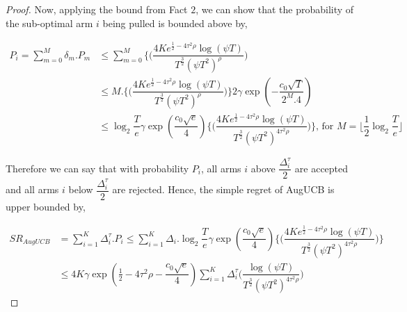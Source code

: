 \begin{proof}
Now, applying the bound from Fact $2$, we can show that the probability of the sub-optimal arm $i$ being pulled is bounded above by,

\begin{align*}
P_{i} = \sum_{m=0}^{M} \delta_{m}.P_{m} &\leq \sum_{m=0}^{M} \bigg\lbrace\bigg(\dfrac{4Ke^{\frac{1}{2}-4\tau^{2}\rho}\log (\psi T )}{T^{\frac{3}{2}}(\psi T^2)^{\rho}}\bigg)\\
& \leq M.\bigg\lbrace\bigg(\dfrac{4Ke^{\frac{1}{2}-4\tau^{2}\rho}\log (\psi T )}{T^{\frac{3}{2}}(\psi T^2)^{\rho}}\bigg)\bigg\rbrace 2\gamma \exp(-\dfrac{c_{0}\sqrt{T}}{2^{M}.4})\\
& \leq \log_{2}\dfrac{T}{e}\gamma \exp(\dfrac{c_{0}\sqrt{e}}{4})\bigg\lbrace\bigg(\dfrac{4Ke^{\frac{1}{2}-4\tau^{2}\rho}\log (\psi T )}{T^{\frac{3}{2}}(\psi T^2)^{4\tau^{2}\rho}}\bigg)\bigg\rbrace \text{, for $M=\big \lfloor \dfrac{1}{2}\log_{2} \dfrac{T}{e}\big\rfloor$}
\end{align*}

Therefore we can say that with probability $P_{i}$, all arms $i$ above $\dfrac{\Delta_{i}^{\tau}}{2}$ are accepted and all arms $i$ below $\dfrac{\Delta_{i}^{\tau}}{2}$ are rejected. Hence, the simple regret of AugUCB is upper bounded by,

\begin{align*}
SR_{AugUCB} &= \sum_{i=1}^{K} \Delta_{i}^{\tau}. P_{i} \leq \sum_{i=1}^{K} \Delta_{i}. \log_{2}\dfrac{T}{e}\gamma \exp(\dfrac{c_{0}\sqrt{e}}{4})\bigg\lbrace\bigg(\dfrac{4Ke^{\frac{1}{2}-4\tau^{2}\rho}\log (\psi T )}{T^{\frac{3}{2}}(\psi T^2)^{4\tau^{2}\rho}}\bigg) \bigg\rbrace \\
&\leq 4K \gamma \exp(\frac{1}{2}- 4\tau^{2}\rho -\dfrac{c_{0}\sqrt{e}}{4}) \sum_{i=1}^{K} \Delta_{i}^{\tau} \bigg(\dfrac{\log (\psi T )}{T^{\frac{3}{2}}(\psi T^2)^{4\tau^{2}\rho}}\bigg) 
\end{align*}


\end{proof}
